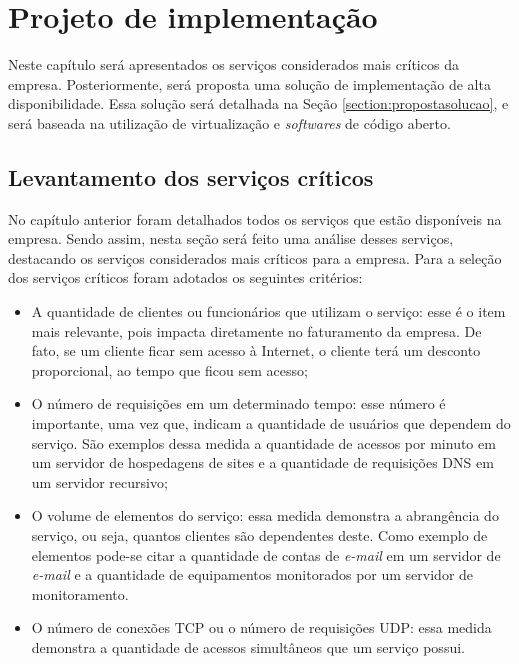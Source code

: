 \chapter{Projeto de implementação}
\label{cap:projetoimplementacao}

Neste capítulo será apresentados os serviços considerados mais críticos da empresa. Posteriormente, será proposta uma solução de implementação 
de alta disponibilidade. Essa solução será detalhada na Seção \ref{section:propostasolucao}, e será baseada na utilização de virtualização e
\textit{softwares} de código aberto. 

\section{Levantamento dos serviços críticos}
\label{section:servcrit}

No capítulo anterior foram detalhados todos os serviços que estão disponíveis na empresa. Sendo assim, nesta seção será feito uma análise desses
serviços, destacando os serviços considerados mais críticos para a empresa. Para a seleção dos serviços críticos foram adotados os seguintes
critérios:
\begin{itemize}
 \item A quantidade de clientes ou funcionários que utilizam o serviço: esse é o item mais relevante, pois impacta diretamente no faturamento
 da empresa. De fato, se um cliente ficar sem acesso à Internet, o cliente terá um desconto proporcional, ao tempo que ficou sem 
 acesso; 
 \item O número de requisições em um determinado tempo: esse número é importante, uma vez que, indicam a quantidade de usuários que dependem do 
 serviço. São exemplos dessa medida a quantidade de acessos por minuto em um servidor de hospedagens de sites e a quantidade de requisições 
 \ac{DNS} em um servidor recursivo;
 \item O volume de elementos do serviço: essa medida demonstra a abrangência do serviço, ou seja, quantos clientes são dependentes deste. 
 Como exemplo de elementos pode-se citar a quantidade de contas de \textit{e-mail} em um servidor de \textit{e-mail} e a quantidade de 
 equipamentos monitorados por um servidor de monitoramento. 
 \item O número de conexões \ac{TCP} ou o número de requisições \ac{UDP}: essa medida demonstra a quantidade de acessos simultâneos que um
 serviço possui. 
\end{itemize}


